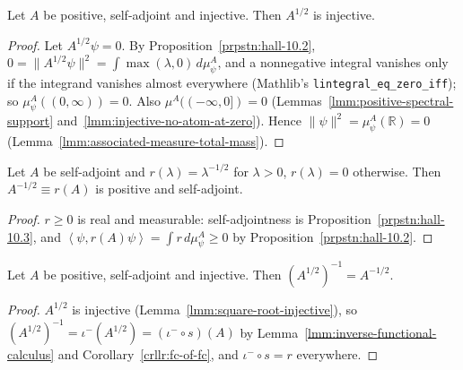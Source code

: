 \begin{lemma}
    \label{lmm:square-root-injective}
    \leanok
    Let $A$ be positive, self-adjoint and injective. Then $A^{1/2}$ is injective.
\end{lemma}
\begin{proof}
    \leanok
    Let $A^{1/2}\psi = 0$. By Proposition~\ref{prpstn:hall-10.2}, $0 = \|A^{1/2}\psi\|^2 = \int \max(\lambda, 0) \, d\mu^A_\psi$, and a nonnegative integral vanishes only if the integrand vanishes almost everywhere (Mathlib's \texttt{lintegral\_eq\_zero\_iff}); so $\mu^A_\psi((0, \infty)) = 0$. Also $\mu^A((-\infty, 0]) = 0$ (Lemmas~\ref{lmm:positive-spectral-support} and~\ref{lmm:injective-no-atom-at-zero}). Hence $\|\psi\|^2 = \mu^A_\psi(\mathbb{R}) = 0$ (Lemma~\ref{lmm:associated-measure-total-mass}).
\end{proof}

\begin{lemma}
    \label{lmm:inverse-square-root-positive}
    \leanok
    Let $A$ be self-adjoint and $r(\lambda) = \lambda^{-1/2}$ for $\lambda > 0$, $r(\lambda) = 0$ otherwise. Then $A^{-1/2} \equiv r(A)$ is positive and self-adjoint.
\end{lemma}
\begin{proof}
    \leanok
    $r \ge 0$ is real and measurable: self-adjointness is Proposition~\ref{prpstn:hall-10.3}, and $\left< \psi, r(A)\psi \right> = \int r \, d\mu^A_\psi \ge 0$ by Proposition~\ref{prpstn:hall-10.2}.
\end{proof}

\begin{corollary}
    \label{crllr:inverse-square-root}
    \leanok
    Let $A$ be positive, self-adjoint and injective. Then $(A^{1/2})^{-1} = A^{-1/2}$.
\end{corollary}
\begin{proof}
    \leanok
    $A^{1/2}$ is injective (Lemma~\ref{lmm:square-root-injective}), so $(A^{1/2})^{-1} = \iota^{-}(A^{1/2}) = (\iota^{-} \circ s)(A)$ by Lemma~\ref{lmm:inverse-functional-calculus} and Corollary~\ref{crllr:fc-of-fc}, and $\iota^{-} \circ s = r$ everywhere.
\end{proof}

